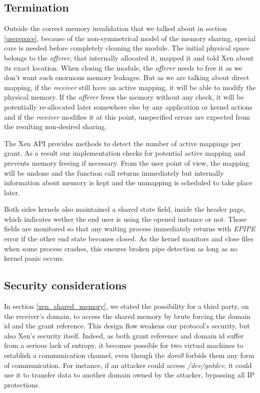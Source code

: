 \documentclass[journal]{IEEEtran}
\begin{document}
\subsection{Termination}
\label{Termination}

Outside the correct memory invalidation that we talked about in section \ref{userspace}, because of the non-symmetrical model of the memory sharing, special care is needed before completely cleaning the module. The initial physical space belongs to the \emph{offerer}, that internally allocated it, mapped it and told Xen about its exact location. When closing the module, the \emph{offerer} needs to free it as we don't want such enormous memory leakages. But as we are talking about direct mapping, if the \emph{receiver} still have an active mapping, it will be able to modify the physical memory.
If the \emph{offerer} frees the memory without any check, it will be potentially re-allocated later somewhere else by any application or kernel actions and if the \emph{receiver} modifies it at this point, unspecified errors are expected from the resulting non-desired sharing.

The Xen API provides methods to detect the number of active mappings per grant. As a result our implementation checks for potential active mapping and prevents memory freeing if necessary. From the user point of view, the mapping will be undone and the function call returns immediately but internally information about memory is kept and the unmapping is scheduled to take place later.

Both sides kernels also maintained a shared state field, inside the header page, which indicates wether the end user is using the opened instance or not. Those fields are monitored so that any waiting process immediately returns with \emph{EPIPE} error if the other end state becomes closed. As the kernel monitors and close files when some process crashes, this ensures broken pipe detection as long as no kernel panic occurs.

\subsection{Security considerations}

In section \ref{xen_shared_memory}, we stated the possibility for a third party, on the receiver's domain, to access the shared memory by brute forcing the domain id and the grant reference. This design flow weakens our protocol's security, but also Xen's security itself. Indeed, as both grant reference and domain id suffer from a serious lack of entropy, it becomes possible for two virtual machines to establish a communication channel, even though the \emph{dom0} forbids them any form of communication. For instance, if an attacker could access \emph{/dev/gntdev}, it could use it to transfer data to another domain owned by the attacker, bypassing all IP protections. 
\end{document}
